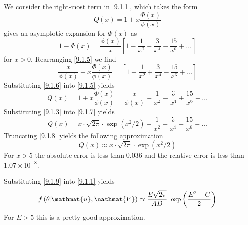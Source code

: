 \documentclass[12pt]{report}
\newcommand{\mat}[1]{\mathmat{#1}}
\begin{document}
We consider the right-most term in \eqref{9.1.1}, which takes the form
%
\begin{equation}\label{9.1.4}
    Q(x) = 1 + x \frac{\Phi(x)}{\phi(x)}
\end{equation}
%
\citet[(26.2.12)]{Abramowitz65} gives an asymptotic expansion for $\Phi(x)$ as
%
\begin{equation}\label{9.1.5}
    1 - \Phi(x) = \frac{\phi(x)}{x} \left[ 1 - \frac{1}{x^2} + \frac{3}{x^4} - \frac{15}{x^6} + \ldots \right]
\end{equation}
%
for $x > 0$. Rearranging \eqref{9.1.5} we find
%
\begin{equation}\label{9.1.6}
     \frac{x}{\phi(x)} - x \frac{\Phi(x)}{\phi(x)} = \left[ 1 - \frac{1}{x^2} + \frac{3}{x^4} - \frac{15}{x^6} + \ldots \right]
\end{equation}
%
Substituting \eqref{9.1.6} into \eqref{9.1.5} yields
%
\begin{equation}\label{9.1.7}
     Q(x) = 1 + x \frac{\Phi(x)}{\phi(x)} = \frac{x}{\phi(x)} + \frac{1}{x^2} - \frac{3}{x^4} + \frac{15}{x^6} - \ldots
\end{equation}
%
Substituting \eqref{9.1.3} into \eqref{9.1.7} yields
%
\begin{equation}\label{9.1.8}
     Q(x) = x \cdot \sqrt{2\pi} \cdot \exp{(x^2/2)} + \frac{1}{x^2} - \frac{3}{x^4} + \frac{15}{x^6} - \ldots
\end{equation}
%
Truncating \eqref{9.1.8} yields the following approximation
%
\begin{equation}\label{9.1.9}
     Q(x) \approx x \cdot \sqrt{2\pi} \cdot \exp{(x^2/2)}
\end{equation}
%
For $x > 5$ the absolute error is less than $0.036$ and the relative error is less than $1.07 \times 10^{-8}$.

Substituting \eqref{9.1.9} into \eqref{9.1.1} yields
%
\begin{equation}\label{9.1.10}
    f\left( \theta | \mat{u}, \mat{V} \right)
    \approx \frac{E\sqrt{2\pi}}{AD} ~ \exp{\left(\frac{E^2 - C}{2}\right)}
\end{equation}
%
For $E > 5$ this is a pretty good approximation.



\end{document}
